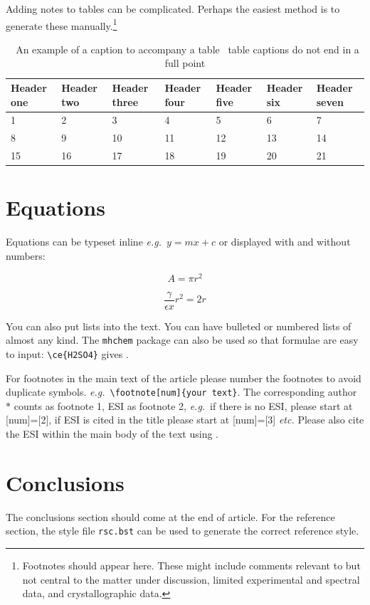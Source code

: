 \documentclass[twoside,twocolumn,9pt]{article}
\begin{document}
Adding notes to tables can be complicated.  Perhaps the easiest method is to generate these manually.\footnote[4]{Footnotes should appear here. These might include comments relevant to but not central to the matter under discussion, limited experimental and spectral data, and crystallographic data.}

\begin{table}
\small
  \caption{\ An example of a caption to accompany a table \textendash\ table captions do not end in a full point}
  \label{tbl:example2}
  \begin{tabular*}{\textwidth}{@{\extracolsep{\fill}}lllllll}
    \hline
    Header one & Header two & Header three & Header four & Header five & Header six  & Header seven\\
    \hline
    1 & 2 & 3 & 4 & 5 & 6  & 7\\
    8 & 9 & 10 & 11 & 12 & 13 & 14 \\
    15 & 16 & 17 & 18 & 19 & 20 & 21\\
    \hline
  \end{tabular*}
\end{table}

\section{Equations}

Equations can be typeset inline \textit{e.g.}\ $ y = mx + c$ or displayed with and without numbers:

 \[ A = \pi r^2 \]

\begin{equation}
  \frac{\gamma}{\epsilon x} r^2 = 2r
\end{equation}

You can also put lists into the text. You can have bulleted or numbered lists of almost any kind. 
The \texttt{mhchem} package can also be used so that formulae are easy to input: \texttt{\textbackslash ce\{H2SO4\}} gives . 

For footnotes in the main text of the article please number the footnotes to avoid duplicate symbols. \textit{e.g.}\ \texttt{\textbackslash footnote[num]\{your text\}}. The corresponding author $\ast$ counts as footnote 1, ESI as footnote 2, \textit{e.g.}\ if there is no ESI, please start at [num]=[2], if ESI is cited in the title please start at [num]=[3] \textit{etc.} Please also cite the ESI within the main body of the text using \dag.

\section{Conclusions}
The conclusions section should come at the end of article. For the reference section, the style file \texttt{rsc.bst} can be used to generate the correct reference style.
\end{document}
